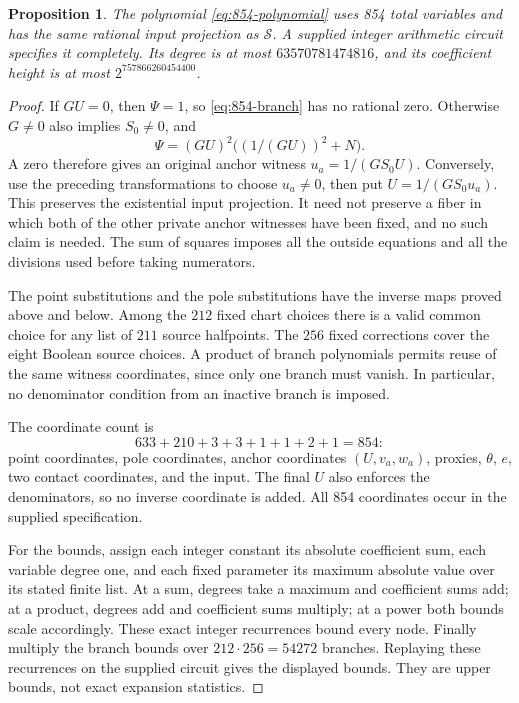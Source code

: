 \documentclass[11pt]{article}
\newtheorem{proposition}[theorem]{Proposition}
\theoremstyle{definition}
\newcommand{\Src}{\mathcal S}
\begin{document}
\begin{proposition}\label{prop:854-explicit}
The polynomial \eqref{eq:854-polynomial} uses 854 total variables
and has the same rational input projection as $\Src$. A supplied
integer arithmetic circuit specifies it completely. Its degree is
at most $63570781474816$, and its coefficient height is at most
$2^{757866260454400}$.
\end{proposition}
\begin{proof}
If $GU=0$, then $\Psi=1$, so \eqref{eq:854-branch} has no rational
zero. Otherwise $G\ne0$ also implies $S_0\ne0$, and
\[
 \Psi=(GU)^2\bigl((1/(GU))^2+N\bigr).
\]
A zero therefore gives an original anchor witness
$u_a=1/(GS_0U)$. Conversely, use the preceding transformations to
choose $u_a\ne0$, then put $U=1/(GS_0u_a)$. This preserves the
existential input projection. It need not preserve a fiber in which
both of the other private anchor witnesses have been fixed, and no
such claim is needed. The sum of squares imposes all the outside
equations and all the divisions used before taking numerators.

The point substitutions and the pole substitutions have the inverse
maps proved above and below. Among the $212$ fixed chart choices
there is a valid common choice for any list of $211$ source halfpoints.
The $256$ fixed corrections cover the eight Boolean source choices.
A product of branch polynomials permits reuse of the same witness
coordinates, since only one branch must vanish. In particular, no
denominator condition from an inactive branch is imposed.

The coordinate count is
\[
 633+210+3+3+1+1+2+1=854:
\]
point coordinates, pole coordinates, anchor coordinates $(U,v_a,w_a)$,
proxies, $\theta$, $e$, two contact coordinates, and the input.
The final $U$ also enforces the denominators, so no inverse coordinate
is added. All 854 coordinates occur in the supplied specification.

For the bounds, assign each integer constant its absolute coefficient
sum, each variable degree one, and each fixed parameter its maximum
absolute value over its stated finite list. At a sum, degrees take a
maximum and coefficient sums add; at a product, degrees add and
coefficient sums multiply; at a power both bounds scale accordingly.
These exact integer recurrences bound every node. Finally multiply the
branch bounds over $212\cdot256=54272$ branches. Replaying these
recurrences on the supplied circuit gives the displayed bounds.
They are upper bounds, not exact expansion statistics.
\end{proof}
\end{document}
